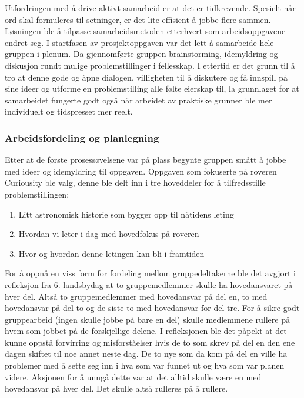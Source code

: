 Utfordringen med å drive aktivt samarbeid er at det er tidkrevende.
Spesielt når ord skal formuleres til setninger, er det lite effisient å jobbe flere sammen.
Løsningen ble å tilpasse samarbeidsmetoden etterhvert som arbeidsoppgavene endret seg.
I startfasen av prosjektoppgaven var det lett å samarbeide hele gruppen i plenum.
Da gjennomførte gruppen brainstorming, idemyldring og diskusjon rundt mulige problemstillinger i fellesskap.
I ettertid er det grunn til å tro at denne gode og åpne dialogen, villigheten til å diskutere og få innspill på sine ideer og utforme en problemstilling alle følte eierskap til, la grunnlaget for at samarbeidet fungerte godt også når arbeidet av praktiske grunner ble mer individuelt og tidspresset mer reelt.

\subsubsection{Arbeidsfordeling og planlegning}
Etter at de første prosessøvelsene var på plass begynte gruppen smått å jobbe med ideer og idemyldring til oppgaven.
Oppgaven som fokuserte på roveren Curiousity ble valg, denne ble delt inn i tre hoveddeler for å tilfredsstille problemstillingen:
\begin{enumerate}
\item Litt astronomisk historie som bygger opp til nåtidens leting
\item Hvordan vi leter i dag med hovedfokus på roveren
\item Hvor og hvordan denne letingen kan bli i framtiden
\end{enumerate}
For å oppnå en viss form for fordeling mellom gruppedeltakerne ble det avgjort i refleksjon fra 6. landsbydag at to gruppemedlemmer skulle ha hovedansvaret på hver del.
Altså to gruppemedlemmer med hovedansvar på del en, to med hovedansvar på del to og de siste to med hovedansvar for del tre.
For å sikre godt gruppearbeid (ingen skulle jobbe på bare en del) skulle medlemmene rullere på hvem som jobbet på de forskjellige delene.
I refleksjonen ble det påpekt at det kunne oppstå forvirring og misforståelser hvis de to som skrev på del en den ene dagen skiftet til noe annet neste dag.
De to nye som da kom på del en ville ha problemer med å sette seg inn i hva som var funnet ut og hva som var planen videre.
Aksjonen for å unngå dette var at det alltid skulle være en med hovedansvar på hver del.
Det skulle altså rulleres på å rullere.

